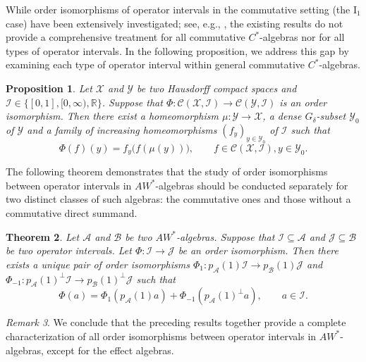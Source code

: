 \documentclass[12pt]{amsart}
\newtheorem{thm}{Theorem}[section]
\newtheorem{prop}[thm]{Proposition}
\theoremstyle{definition}
\theoremstyle{remark}
\newtheorem{rem}[thm]{Remark}
\numberwithin{equation}{section}
\begin{document}
While order isomorphisms of operator intervals in the commutative setting (the $\mathrm{I}_1$ case) have been extensively investigated; see, e.g., \cite{Lochan, Marovt}, the existing results do not provide a comprehensive treatment for all commutative $C^*$-algebras nor for all types of operator intervals. In the following proposition, we address this gap by examining each type of operator interval within general commutative $C^*$-algebras.




\begin{prop}\label{comm_case}
	Let $\mathcal{X}$ and $\mathcal{Y}$ be two Hausdorff compact spaces and $\mathcal{I}\in\{[0,1], [0,\infty), \mathbb{R}  \}$.	Suppose that $\Phi:\mathcal{C}(\mathcal{X},\mathcal{I})\to \mathcal{C}(\mathcal{Y},\mathcal{I})$  is  an order isomorphism.  Then there exist a homeomorphism $\mu:\mathcal{Y}\to\mathcal{X}$, a  dense $G_\delta$-subset $\mathcal{Y}_{0}$ of $\mathcal{Y}$ and a family of increasing homeomorphisms $(f_y)_{y\in\mathcal{Y}_{0}}$ of $\mathcal{I}$ such that 
	\begin{equation}\label{comm-form}
		\Phi(f)(y)=f_y\big( f(\mu(y))\big),\qquad f\in \mathcal{C}(\mathcal{X},\mathcal{I}), y\in\mathcal{Y}_{0}.	
	\end{equation}
\end{prop}



The following theorem demonstrates that the study of order isomorphisms between operator intervals in $AW^*$-algebras should be conducted separately for two distinct classes of such algebras: the commutative ones and those without a commutative direct summand. 

\begin{thm}\label{I_1}
	Let $\mathcal{A}$ and  $\mathcal{B}$ be two  $AW^*$-algebras. Suppose that $\mathcal{I}\subseteq\mathcal{A}$ and $\mathcal{J}\subseteq\mathcal{B}$ be two operator intervals. Let $\Phi: \mathcal{I}\to \mathcal{J}$ be an order isomorphism. Then    there exists a unique  pair of   order isomorphisms $\Phi_1:p_\mathcal{A}(1)\mathcal{I}\to p_\mathcal{B}(1)\mathcal{J}$ and  $\Phi_{-1}:p_\mathcal{A}(1)^\perp \mathcal{I}\to p_\mathcal{B}(1)^\perp\mathcal{J}$  such that  $$\Phi(a)=\Phi_1\left( p_\mathcal{A}(1)a\right) +\Phi_{-1}\left( p_\mathcal{A}(1)^{\perp}a\right) , \qquad a\in \mathcal{I}.$$ 
\end{thm}

\begin{rem}
	We conclude that the preceding results together provide a complete characterization of all order isomorphisms between operator intervals in $AW^*$-algebras, except for the effect algebras.
\end{rem}
\end{document}
